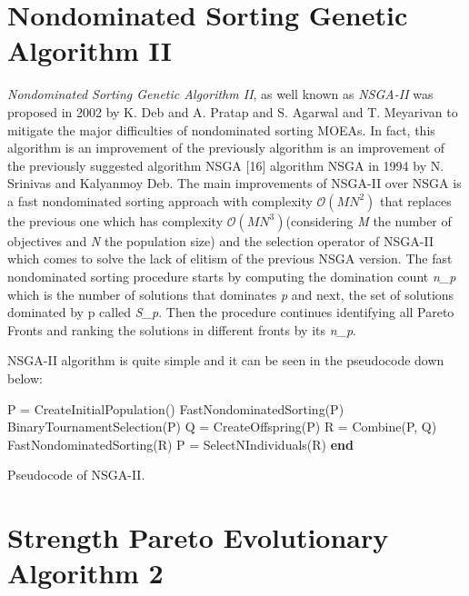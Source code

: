 \section{Nondominated Sorting Genetic Algorithm II}
\textit{Nondominated Sorting Genetic Algorithm II}, as well known as \textit{NSGA-II} was proposed in 2002 by K. Deb and A. Pratap and S. Agarwal and T. Meyarivan to mitigate the major difficulties of nondominated sorting MOEAs\cite{996017}. In fact, this algorithm is an improvement of the previously algorithm is an improvement of the previously suggested algorithm NSGA [16] algorithm NSGA\cite{Srinivas1994MuiltiobjectiveOU} in 1994 by N. Srinivas and Kalyanmoy Deb.
The main improvements of NSGA-II over NSGA is a fast nondominated sorting approach with complexity $\mathcal{O}(MN^{2})$ that replaces the previous one which has complexity $\mathcal{O}(MN^{3})$\cite{996017}(considering \textit{M} the number of objectives and \textit{N} the population size) and the selection operator of NSGA-II which comes to solve the lack of elitism of the previous NSGA version. The fast nondominated sorting procedure starts by computing the domination count \textit{n_{p}} which is the number of solutions that dominates \textit{p} and next, the set of solutions dominated by p called \textit{S_{p}}. Then the procedure continues identifying all Pareto Fronts\cite{996017} and ranking the solutions in different fronts by its \textit{n_{p}}.

NSGA-II algorithm is quite simple and it can be seen in the pseudocode down below:

\begin{algorithm}[H]
\begin{algorithmic}[1]
\State P = CreateInitialPopulation()\;
\State  FastNondominatedSorting(P)\;
    \State BinaryTournamentSelection(P)\;
    \State Q = CreateOffspring(P)\;
    \State R = Combine(P, Q)\;
    \State FastNondominatedSorting(R)\;
    \State P = SelectNIndividuals(R)\;
  \EndWhile
  \State \textbf{end}
\end{algorithmic}
\caption{Pseudocode of NSGA-II.}
\end{algorithm}

\newpage
\section{Strength Pareto Evolutionary Algorithm 2}

